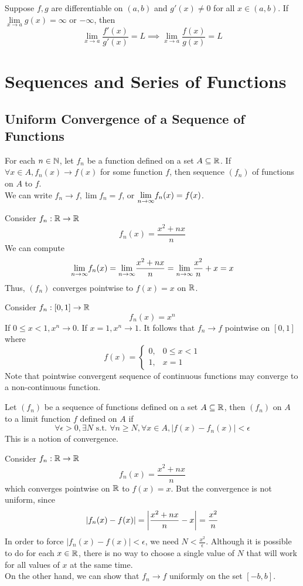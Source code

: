 \documentclass[11pt]{article}
\begin{document}
 Suppose $f,g$ are differentiable on $(a,b)$ and $g'(x) \neq 0$ for all $x \in (a,b)$. If $\underset{x \rightarrow a}{\lim} g(x) = \infty$ or $-\infty$, then
$$\underset{x \rightarrow a}{\lim} \frac{f'(x)}{g'(x)} = L \implies \underset{x \rightarrow a}{\lim}\frac{f(x)}{g(x)} = L$$

\section{Sequences and Series of Functions}
\subsection{Uniform Convergence of a Sequence of Functions}
 For each $n \in \mathbb{N}$, let $f_n$ be a function defined on a set $A \subseteq \mathbb{R}$. If $\forall x \in A, f_n(x) \rightarrow f(x)$ for some function $f$, then sequence $(f_n)$ of functions  on $A$ to $f$.\\
 We can write $f_n \rightarrow f, \lim f_n = f$, or $\underset{n \rightarrow \infty}{\lim} f_n(x) = f(x)$.
 
 \example Consider $f_n: \mathbb{R} \rightarrow \mathbb{R}$
 $$f_n(x) = \frac{x^2 + nx}{n}$$
 We can compute
 $$\underset{n \rightarrow \infty}{\lim} f_n(x) = \underset{n \rightarrow \infty}{\lim} \frac{x^2 + nx}{n} = \underset{n \rightarrow \infty}{\lim} \frac{x^2}{n} + x = x$$
 Thus, $(f_n)$ converges pointwise to $f(x) = x$ on $\mathbb{R}$.
 
 \example Consider $f_n: [0,1] \rightarrow \mathbb{R}$
 $$f_n(x) = x^n$$
 If $0 \leq x < 1, x^n \rightarrow 0$. If $x = 1, x^n \rightarrow 1$. It follows that $f_n \rightarrow f$ pointwise on $[0,1]$ where
 $$f(x) = \begin{cases}
 	0, & 0\leq x < 1\\
 	1, & x = 1
 \end{cases}$$
 Note that pointwise convergent sequence of continuous functions may converge to a non-continuous function.
 
  Let $(f_n)$ be a sequence of functions defined on a set $A \subseteq \mathbb{R}$, then $(f_n)$  on $A$ to a limit function $f$ defined on $A$ if
 $$\forall \epsilon > 0, \exists N \text{ s.t. } \forall n \geq N, \forall x \in A, |f(x) - f_n(x)| < \epsilon$$
 \remark
 This is a  notion of convergence.

\example Consider $f_n: \mathbb{R} \rightarrow \mathbb{R}$
 $$f_n(x) = \frac{x^2 + nx}{n}$$
 which converges pointwise on $\mathbb{R}$ to $f(x) = x$. But the convergence is not uniform, since
 $$|f_n(x) - f(x)| = \left \vert {\frac{x^2 + nx}{n} - x} \right \vert = \frac{x^2}{n}$$
 In order to force $|f_n(x) - f(x)| < \epsilon$, we need $N < \frac{x^2}{\epsilon}$. Although it is possible to do for each $x \in \mathbb{R}$, there is no way to choose a single value of $N$ that will work for all values of $x$ at the same time. \\
 On the other hand, we can show that $f_n \rightarrow f$ uniformly on the set $[-b, b]$.
\end{document}
